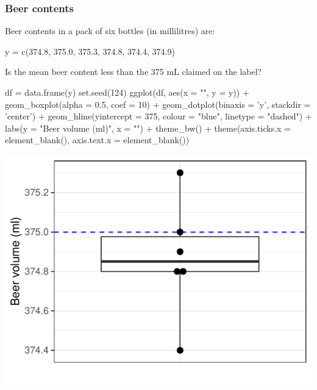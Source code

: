 \documentclass[a4paper]{article}
\begin{document}
\subsubsection{Beer contents}
Beer contents in a pack of six bottles (in millilitres) are:
\begin{Schunk}
\begin{Sinput}
y = c(374.8, 375.0, 375.3, 374.8, 374.4, 374.9)
\end{Sinput}
\end{Schunk}
Is the mean beer content less than the 375 mL claimed on the label?
\begin{Schunk}
\begin{Sinput}
df = data.frame(y)
set.seed(124)
ggplot(df, aes(x = "", y = y)) +
  geom_boxplot(alpha = 0.5, coef = 10) + 
  geom_dotplot(binaxis = 'y', 
               stackdir = 'center') + 
  geom_hline(yintercept = 375, 
             colour = "blue",
             linetype = "dashed") + 
  labs(y = "Beer volume (ml)", x = "") +
  theme_bw() + 
  theme(axis.ticks.x = element_blank(),
        axis.text.x = element_blank())
\end{Sinput}


{\centering \includegraphics[width=\maxwidth]{figure/listings-unnamed-chunk-182-1} 

}

\end{Schunk}
\end{document}
